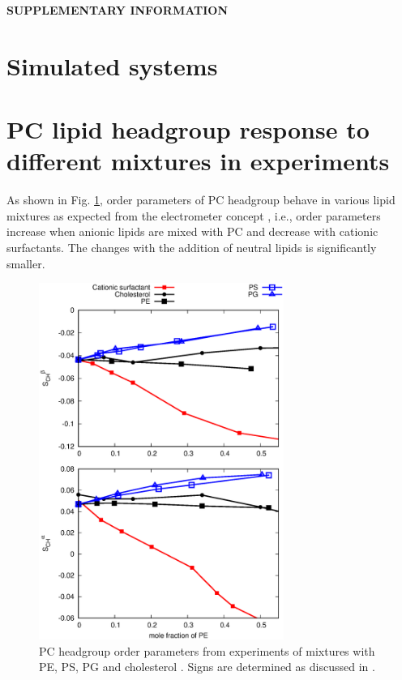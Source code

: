 \documentclass[aps,prl,superscriptaddress,twocolumn]{revtex4}
\begin{document}
\begin{acknowledgments}
\end{acknowledgments}
\newpage
\appendix
\begin{center}
{\bf SUPPLEMENTARY INFORMATION}
\end{center}

\section{Simulated systems}


\section{PC lipid headgroup response to different mixtures in experiments}
As shown in Fig. \ref{HGorderparametersPCvsPEPSPGchol}, order parameters of PC
headgroup behave in various lipid mixtures as expected from the electrometer concept \cite{seelig87, scherer87},
i.e., order parameters increase when anionic lipids are mixed with PC and decrease with cationic
surfactants. The changes with the addition of neutral lipids is significantly smaller.
\begin{figure}[]
  \centering
  \includegraphics[width=8.0cm]{../Figs/HGorderparametersPCvsPEPSPGchol.eps}
  \caption{\label{HGorderparametersPCvsPEPSPGchol}
    PC headgroup order parameters from experiments of mixtures with
    PE, PS, PG and cholesterol \cite{scherer87,scherer89,ferreira13}.
    Signs are determined as discussed in \cite{botan15,ollila16}.
  }
\end{figure}
\end{document}
